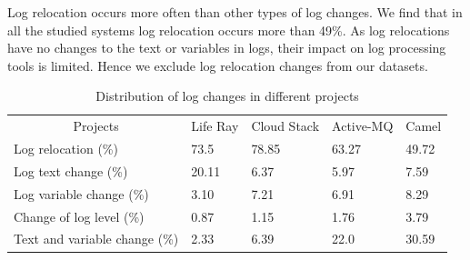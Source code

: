 Log relocation occurs more often than other types of log changes. We find that in all the studied systems log relocation occurs more than 49\%. As log relocations have no changes to the text or variables in logs, their impact on log processing tools is limited. Hence we exclude log relocation changes from our datasets. 


\begin{table}[t]
	\centering
	\caption{Distribution of log changes in different projects}
	\label{tba:logtype}
	\begin{tabular}{l|llll}
		\cline{1-5}  	\multicolumn{1}{|c}{Projects}    & \multicolumn{1}{|c}{ Life Ray }  &  \multicolumn{1}{|c}{ Cloud Stack}	   &  \multicolumn{1}{|c}{ Active-MQ }  & 
		 \multicolumn{1}{|c|}{ Camel } \\ \cline{1-5}   
		
		Log relocation (\%)       & 73.5     & 78.85 &  63.27  & 49.72         \\
		
		Log text change (\%)      & 20.11    & 6.37 & 5.97    & 7.59       \\
		Log variable change (\%)   & 3.10     & 7.21 & 6.91 &  8.29     \\
		Change of log level (\%) & 0.87   & 1.15 & 1.76  &  3.79       \\ 
		Text and variable change (\%) & 2.33     & 6.39 & 22.0   &  30.59    \\ \cline{1-5}
	\end{tabular}
\end{table}


